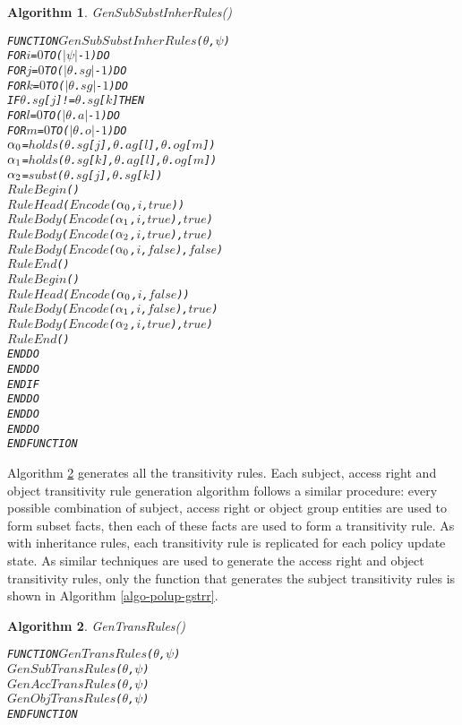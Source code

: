 \documentclass[11pt]{report}
\newenvironment{vverbatim}
{
  \begin{alltt}
}
{
    \vspace{-\baselineskip}
  \end{alltt}
}
\newtheorem{vvalgorithm}{Algorithm}[chapter]
\newenvironment{valgorithm}[2]
{
  \begin{vvalgorithm}{#1}
    \label{#2}
    \small
    \begin{vverbatim}
}
{
    \end{vverbatim}
  \end{vvalgorithm}
}
\begin{document}
          \begin{valgorithm}{GenSubSubstInherRules()}{algo-polup-gssir}
FUNCTION \(GenSubSubstInherRules\)(\(\theta\), \(\psi\))
  FOR \(i\) = \(0\) TO (\(|\psi|\) - \(1\)) DO
    FOR \(j\) = \(0\) TO (\(|\)\(\theta\).\(sg\)\(|\) - \(1\)) DO
      FOR \(k\) = \(0\) TO (\(|\)\(\theta\).\(sg\)\(|\) - \(1\)) DO
        IF \(\theta\).\(sg\)[\(j\)] != \(\theta\).\(sg\)[\(k\)] THEN
          FOR \(l\) = \(0\) TO (\(|\)\(\theta\).\(a\)\(|\) - \(1\)) DO
            FOR \(m\) = \(0\) TO (\(|\)\(\theta\).\(o\)\(|\) - \(1\)) DO
              \(\alpha\sb{0}\) = \(holds\)(\(\theta\).\(sg\)[\(j\)], \(\theta\).\(ag\)[\(l\)], \(\theta\).\(og\)[\(m\)])
              \(\alpha\sb{1}\) = \(holds\)(\(\theta\).\(sg\)[\(k\)], \(\theta\).\(ag\)[\(l\)], \(\theta\).\(og\)[\(m\)])
              \(\alpha\sb{2}\) = \(subst\)(\(\theta\).\(sg\)[\(j\)], \(\theta\).\(sg\)[\(k\)])
              \(RuleBegin\)()
              \(RuleHead\)(\(Encode\)(\(\alpha\sb{0}\), \(i\), \(true\)))
              \(RuleBody\)(\(Encode\)(\(\alpha\sb{1}\), \(i\), \(true\)), \(true\))
              \(RuleBody\)(\(Encode\)(\(\alpha\sb{2}\), \(i\), \(true\)), \(true\))
              \(RuleBody\)(\(Encode\)(\(\alpha\sb{0}\), \(i\), \(false\)), \(false\))
              \(RuleEnd\)()
              \(RuleBegin\)()
              \(RuleHead\)(\(Encode\)(\(\alpha\sb{0}\), \(i\), \(false\)))
              \(RuleBody\)(\(Encode\)(\(\alpha\sb{1}\), \(i\), \(false\)), \(true\))
              \(RuleBody\)(\(Encode\)(\(\alpha\sb{2}\), \(i\), \(true\)), \(true\))
              \(RuleEnd\)()
            ENDDO
          ENDDO
        ENDIF
      ENDDO
    ENDDO
  ENDDO
ENDFUNCTION
          \end{valgorithm}

          Algorithm \ref{algo-polup-gtrar} generates all the transitivity
          rules. Each subject, access right and object transitivity rule
          generation algorithm follows a similar procedure: every possible
          combination of subject, access right or object group entities are
          used to form subset facts, then each of these facts are used to
          form a transitivity rule. As with inheritance rules, each
          transitivity rule is replicated for each policy update state.
          As similar techniques are used to generate the access right and
          object transitivity rules, only the function that generates the
          subject transitivity rules is shown in Algorithm
          \ref{algo-polup-gstrr}.

          \begin{valgorithm}{GenTransRules()}{algo-polup-gtrar}
FUNCTION \(GenTransRules\)(\(\theta\), \(\psi\))
  \(GenSubTransRules\)(\(\theta\), \(\psi\))
  \(GenAccTransRules\)(\(\theta\), \(\psi\))
  \(GenObjTransRules\)(\(\theta\), \(\psi\))
ENDFUNCTION
          \end{valgorithm}
\end{document}
